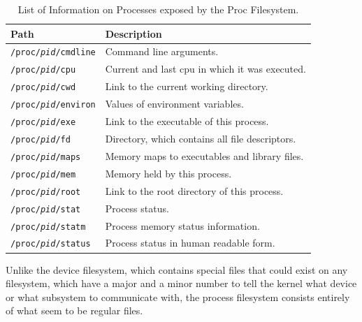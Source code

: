 \documentclass[a4paper]{article}
\begin{document}
\begin{table}
\renewcommand{\arraystretch}{1.25}
\centering
\caption{List of Information on Processes exposed by the Proc Filesystem.}  
\label{tbl:procfs3}
\begin{tabular}{@{}lp{8cm}@{}}
\toprule
Path & Description\\
\midrule
\texttt{/proc/\emph{pid}/cmdline} &
Command line arguments.\\

\texttt{/proc/\emph{pid}/cpu} &
Current and last cpu in which it was executed.\\

\texttt{/proc/\emph{pid}/cwd} &
Link to the current working directory.\\

\texttt{/proc/\emph{pid}/environ} &
Values of environment variables.\\

\texttt{/proc/\emph{pid}/exe} &
Link to the executable of this process.\\

\texttt{/proc/\emph{pid}/fd} &
Directory, which contains all file descriptors.\\

\texttt{/proc/\emph{pid}/maps} &
Memory maps to executables and library files.\\

\texttt{/proc/\emph{pid}/mem} &
Memory held by this process.\\

\texttt{/proc/\emph{pid}/root} &
Link to the root directory of this process.\\

\texttt{/proc/\emph{pid}/stat} &
Process status.\\

\texttt{/proc/\emph{pid}/statm} &
Process memory status information.\\

\texttt{/proc/\emph{pid}/status} &
Process status in human readable form.\\
\bottomrule
\end{tabular}
\end{table}

Unlike the device filesystem, which contains special files that could exist on any filesystem, which have a major and a minor number to tell the kernel what device or what subsystem to communicate with, the process filesystem consists entirely of what seem to be regular files. 
\end{document}
